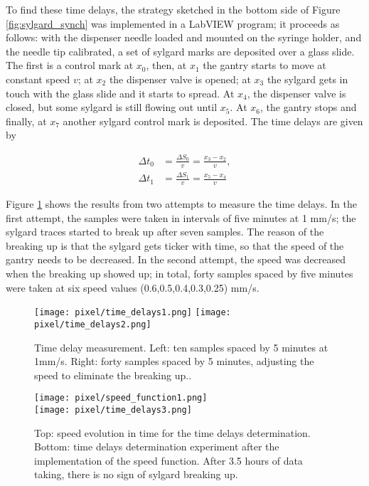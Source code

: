 To find these time delays, the strategy sketched in the bottom side of Figure \ref{fig:sylgard_synch} was implemented in a LabVIEW program; it proceeds as follows: with the dispenser needle loaded and mounted on the syringe holder, and the needle tip calibrated, a set of sylgard marks are deposited over a glass slide. The first is a control mark at $x_0$, then, at $x_1$ the gantry starts to move at constant speed $v$; at $x_2$ the dispenser valve is opened; at $x_3$ the sylgard gets in touch with the glass slide and it starts to spread. At $x_4$, the dispenser valve is closed, but some sylgard is still flowing out until $x_5$. At $x_6$, the gantry stops and finally, at $x_7$ another sylgard control mark is deposited. The time delays are given by 

\begin{align}
  \Delta t_0&=\frac{\Delta S_0}{v}=\frac{x_3-x_2}{v},\\
  \Delta t_1&=\frac{\Delta S_1}{v}=\frac{x_5-x_4}{v}
\end{align}

Figure \ref{fig:delays_measure} shows the results from two attempts to measure the time delays. In the first attempt, the samples were taken in intervals of five minutes at 1 mm/s; the sylgard traces started to break up after seven samples. The reason of the breaking up is that the sylgard gets ticker with time, so that the speed of the gantry needs to be decreased. In the second attempt, the speed was decreased when the breaking up showed up; in total, forty samples spaced by five minutes were taken at six speed values (0.6,0.5,0.4,0.3,0.25) mm/s.

\begin{figure}[h]
  \begin{center}
    \texttt{[image: pixel/time\_delays1.png]} 
    \texttt{[image: pixel/time\_delays2.png]}
    \caption[Time delay measurements.]{Time delay measurement. Left: ten samples spaced by 5 minutes at 1mm/s. Right: forty samples spaced by 5 minutes, adjusting the speed to eliminate the breaking up..}\label{fig:delays_measure}
  \end{center}
\end{figure}

\begin{figure}[h]
  \begin{center}
    \texttt{[image: pixel/speed\_function1.png]}\\ 
    \texttt{[image: pixel/time\_delays3.png]}
    \caption[Speed function for sylgard deposition.]{Top: speed evolution in time for the time delays determination. Bottom: time delays determination experiment after the implementation of the speed function. After 3.5 hours of data taking, there is no sign of sylgard breaking up.}\label{fig:speed_function}
  \end{center}
\end{figure}

